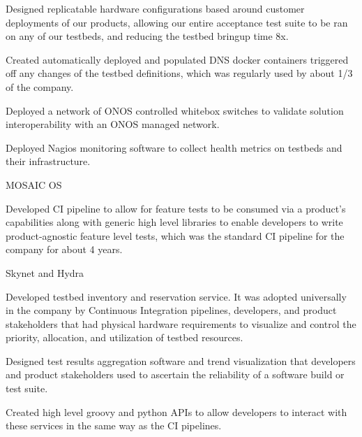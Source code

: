 \begin{cventries}
{\begin{cvitems}
        \item {Designed replicatable hardware configurations based around customer deployments of our products, allowing our entire acceptance test suite to be ran on any of our testbeds, and reducing the testbed bringup time 8x.}
        \item {Created automatically deployed and populated DNS docker containers triggered off any changes of the testbed definitions, which was regularly used by about 1/3 of the company.}
        \item {Deployed a network of ONOS controlled whitebox switches to validate solution interoperability with an ONOS managed network.}
        \item {Deployed Nagios monitoring software to collect health metrics on testbeds and their infrastructure.}
      \end{cvitems}
    }

  \cventry
    {} {MOSAIC OS} {} {} {
      \begin{cvitems}
        \item {Developed CI pipeline to allow for feature tests to be consumed via a product's capabilities along with generic high level libraries to enable developers to write product-agnostic feature level tests, which was the standard CI pipeline for the company for about 4 years.}
      \end{cvitems}
    }

  \cventry
    {} {Skynet and Hydra} {} {} {
      \begin{cvitems} %
        \item {Developed testbed inventory and reservation service. It was adopted universally in the company by Continuous Integration pipelines, developers, and product stakeholders that had physical hardware requirements to visualize and control the priority, allocation, and utilization of testbed resources.}
        \item {Designed test results aggregation software and trend visualization that developers and product stakeholders used to ascertain the reliability of a software build or test suite.}
        \item {Created high level groovy and python APIs to allow developers to interact with these services in the same way as the CI pipelines.}
      \end{cvitems}
    }


\end{cventries}
